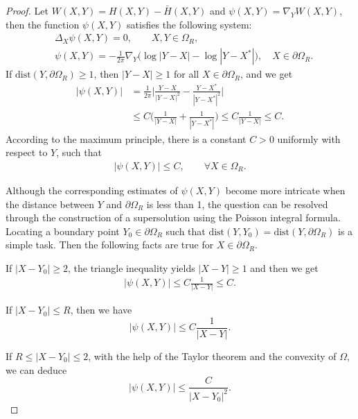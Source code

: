 \documentclass[10pt,a4paper]{amsart}
\begin{document}
\begin{proof}
Let $W(X,Y)=H(X,Y)-\bar{H}(X,Y)$ and $\psi(X,Y)=\nabla_{Y}W(X,Y)$, then the function $\psi(X,Y)$ satisfies the following system:
\begin{align}
&\Delta_{X}\psi(X,Y)=0, \qquad X,Y\in\Omega_{R},\nonumber\\
&\psi(X,Y)=-\frac{1}{2\pi}\nabla_{Y}\big(\log|Y-X|-\log|Y-X^{*}|\big),\quad X\in\partial\Omega_{R}.\nonumber
\end{align}
%
If $\text{dist}(Y,\partial\Omega_{R})\geq 1$, then $|Y-X|\geq 1$ for all $X\in\partial\Omega_{R}$,  and we get
\begin{align}
|\psi(X,Y)|&=\frac{1}{2\pi}\big|\frac{Y-X}{|Y-X|^{2}}-\frac{Y-X^{*}}{|Y-X^{*}|^{2}}\big|\nonumber\\
&\leq C \big(\frac{1}{|Y-X|}+\frac{1}{|Y-X^{*}|}\big)\leq C\frac{1}{|Y-X|}\leq C.\nonumber
\end{align}
 According to the maximum principle, there is a constant $C>0$ uniformly with respect to $Y$, such that
 \begin{align}
|\psi(X,Y)|\leq C, \qquad  \forall X\in \Omega_{R}.\nonumber
\end{align}

Although the corresponding estimates  of $\psi(X,Y)$  become more intricate when the distance between $Y$ and $\partial\Omega_{R}$ is less than 1, the question can be resolved through the construction of a supersolution using the Poisson integral formula.
 Locating a boundary point $Y_{0}\in\partial\Omega_{R}$ such that $\text{dist}(Y,Y_{0})=\text{dist}(Y,\partial\Omega_{R})$ is a simple task. Then the following facts are true for $X\in \partial\Omega_{R}$.

If $|X-Y_{0}|\geq 2$, the triangle inequality  yields $|X-Y|\geq 1$ and then we get
\begin{align}
|\psi(X,Y)|\leq C\frac{1}{|X-Y|}\leq C. \nonumber
\end{align}

If $|X-Y_{0}|\leq R$, then we have
$$|\psi(X,Y)|\leq C\frac{1}{|X-Y|}.$$

If $R\leq|X-Y_{0}|\leq 2$, with the help of the Taylor theorem and the convexity of $\Omega$, we can deduce
$$|\psi(X,Y)|\leq \frac{C}{|X-Y_{0}|^{2}}.$$


\end{proof}
\end{document}

